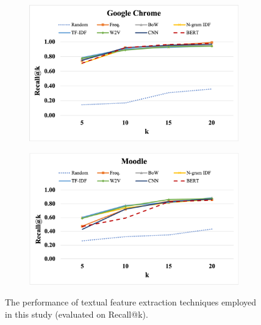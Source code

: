 \begin{figure}[ht]
	\centering
	\begin{subfigure}[b]{0.9\textwidth}
		\includegraphics[width=\textwidth]{"Figures/recall_chrome"}
	\end{subfigure}
	\hfill
	\begin{subfigure}[b]{0.9\textwidth}
		\includegraphics[width=\textwidth]{"Figures/recall_moodle"}
	\end{subfigure}
	\caption{The performance of textual feature extraction techniques employed in this study (evaluated on Recall@k).}
	\label{fig:recall}
\end{figure}


